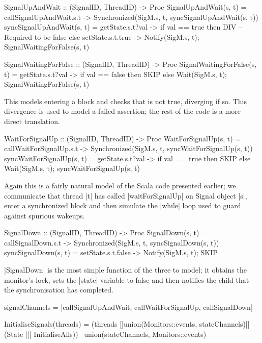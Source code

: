 \begin{cspm}
  SignalUpAndWait :: (SignalID, ThreadID) -> Proc
  SignalUpAndWait(s, t) = 
    callSignalUpAndWait.s.t -> Synchronized(SigM.s, t, syncSignalUpAndWait(s, t))
  syncSignalUpAndWait(s, t) = 
    getState.s.t?val -> if val == true then DIV -- Required to be false
                        else setState.s.t.true -> 
                            Notify(SigM.s, t); SignalWaitingForFalse(s, t)


  SignalWaitingForFalse :: (SignalID, ThreadID) -> Proc
  SignalWaitingForFalse(s, t) = 
    getState.s.t?val -> if val == false then SKIP
                        else Wait(SigM.s, t); SignalWaitingForFalse(s, t)
                             
\end{cspm}

This models entering a \inlineScala {} block and checks that  is not true, diverging if so. This divergence is used to model a failed assertion; the rest of the code is a more direct translation.

\begin{cspm}
  WaitForSignalUp :: (SignalID, ThreadID) -> Proc  
  WaitForSignalUp(s, t) = 
    callWaitForSignalUp.s.t -> Synchronized(SigM.s, t, syncWaitForSignalUp(s, t))        
  syncWaitForSignalUp(s, t) = 
    getState.s.t?val -> if val == true then  SKIP 
                        else Wait(SigM.s, t); syncWaitForSignalUp(s, t)
\end{cspm}

Again this is a fairly natural model of the Scala code presented earlier; we communicate that thread |t| has called |waitForSignalUp| on Signal object |s|, enter a synchronized block and then simulate the \inlineScala|while| \inlineCSP loop used to guard against spurious wakeups.

\begin{cspm}
  SignalDown :: (SignalID, ThreadID) -> Proc
  SignalDown(s, t) = callSignalDown.s.t -> Synchronized(SigM.s, t, syncSignalDown(s, t))
  syncSignalDown(s, t) = setState.s.t.false -> Notify(SigM.s, t); SKIP
\end{cspm}

|SignalDown| is the most simple function of the three to model; it obtains the monitor's lock, sets the |state| variable to false and then notifies the child that the synchronisation has completed.

\begin{cspm}
  signalChannels = {|callSignalUpAndWait, callWaitForSignalUp, callSignalDown|}
  
  InitialiseSignals(threads) = 
    (threads [|union(Monitors::events, stateChannels)|] 
      (State ||| InitialiseAlls)) \ union(stateChannels, Monitors::events)
\end{cspm}

